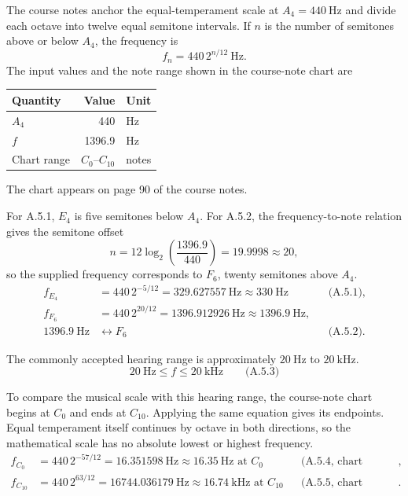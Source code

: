 The course notes anchor the equal-temperament scale at $A_4=440\ \mathrm{Hz}$ and divide each octave into twelve equal semitone intervals. If $n$ is the number of semitones above or below $A_4$, the frequency is
\[
f_n=440\,2^{n/12}\ \mathrm{Hz}.
\]
The input values and the note range shown in the course-note chart are
\begin{center}\small
\begin{tabular}{@{}lrl@{}}
\toprule\noalign{}
Quantity & Value & Unit \\
\midrule\noalign{}
$A_4$ & 440 & Hz \\
$f$ & 1396.9 & Hz \\
Chart range & $C_0$--$C_{10}$ & notes \\
\bottomrule
\end{tabular}
\end{center}
The chart appears on page 90 of the course notes.

For A.5.1, $E_4$ is five semitones below $A_4$. For A.5.2, the frequency-to-note relation gives the semitone offset
\[
n=12\log_2\!\left(\frac{1396.9}{440}\right)=19.9998\approx20,
\]
so the supplied frequency corresponds to $F_6$, twenty semitones above $A_4$.
\[
\begin{aligned}
f_{E_4}&=440\,2^{-5/12}=329.627557\ \mathrm{Hz}\approx\boxed{330\ \mathrm{Hz}} &&\text{(A.5.1)},\\
f_{F_6}&=440\,2^{20/12}=1396.912926\ \mathrm{Hz}\approx1396.9\ \mathrm{Hz},\\
1396.9\ \mathrm{Hz}&\longleftrightarrow\boxed{F_6} &&\text{(A.5.2)}.
\end{aligned}
\]

The commonly accepted hearing range is approximately $20\ \mathrm{Hz}$ to $20\ \mathrm{kHz}$.
\[
\boxed{20\ \mathrm{Hz}\leq f\leq20\ \mathrm{kHz}}\qquad\text{(A.5.3)}
\]

To compare the musical scale with this hearing range, the course-note chart begins at $C_0$ and ends at $C_{10}$. Applying the same equation gives its endpoints. Equal temperament itself continues by octave in both directions, so the mathematical scale has no absolute lowest or highest frequency.
\[
\begin{aligned}
f_{C_0}&=440\,2^{-57/12}=16.351598\ \mathrm{Hz}\approx\boxed{16.35\ \mathrm{Hz}\text{ at }C_0} &&\text{(A.5.4, chart minimum)},\\
f_{C_{10}}&=440\,2^{63/12}=16744.036179\ \mathrm{Hz}\approx\boxed{16.74\ \mathrm{kHz}\text{ at }C_{10}} &&\text{(A.5.5, chart maximum)}.
\end{aligned}
\]


